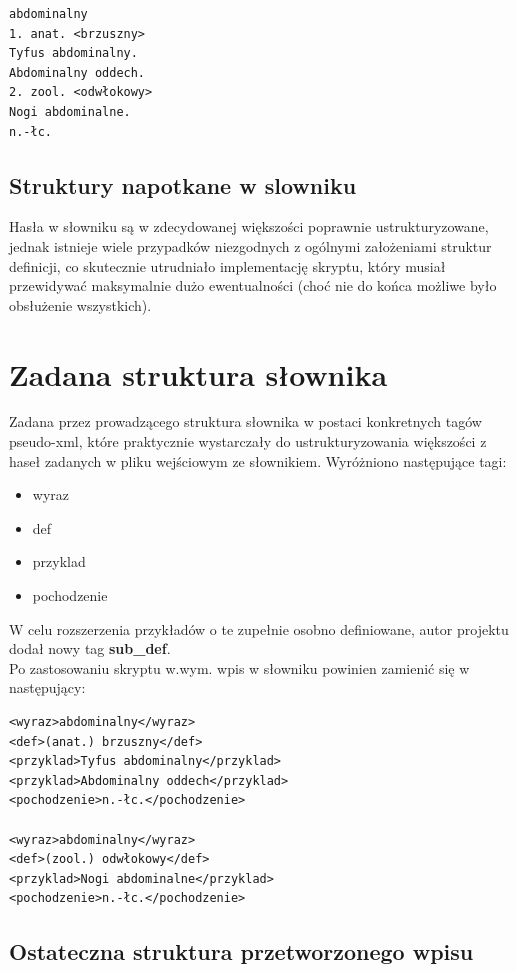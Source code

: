 \documentclass[12pt]{article}
\begin{document}
\begin{verbatim}
abdominalny 
1. anat. <brzuszny>
Tyfus abdominalny.
Abdominalny oddech.
2. zool. <odwłokowy>
Nogi abdominalne.
n.-łc.
\end{verbatim}

\subsection{Struktury napotkane w slowniku}
Hasła w słowniku są w zdecydowanej większości poprawnie ustrukturyzowane, jednak
istnieje wiele przypadków niezgodnych z ogólnymi założeniami struktur definicji, co 
skutecznie utrudniało implementację skryptu, który musiał przewidywać maksymalnie dużo
ewentualności (choć nie do końca możliwe było obsłużenie wszystkich).

\section{Zadana struktura słownika}
Zadana przez prowadzącego struktura słownika w postaci konkretnych tagów pseudo-xml,
które praktycznie wystarczały do ustrukturyzowania większości z haseł zadanych w pliku
wejściowym ze słownikiem. Wyróżniono następujące tagi:

\begin{itemize}
  \item wyraz
  \item def
  \item przyklad
  \item pochodzenie
\end{itemize}

W celu rozszerzenia przykładów o te zupełnie osobno definiowane, autor projektu dodał
nowy tag \textbf{sub\_def}.\\

Po zastosowaniu skryptu w.wym. wpis w słowniku powinien zamienić się w następujący:

\begin{verbatim}
<wyraz>abdominalny</wyraz>
<def>(anat.) brzuszny</def>
<przyklad>Tyfus abdominalny</przyklad>
<przyklad>Abdominalny oddech</przyklad>
<pochodzenie>n.-łc.</pochodzenie>

<wyraz>abdominalny</wyraz>
<def>(zool.) odwłokowy</def>
<przyklad>Nogi abdominalne</przyklad>
<pochodzenie>n.-łc.</pochodzenie>

\end{verbatim}

\subsection{Ostateczna struktura przetworzonego wpisu}
\end{document}
